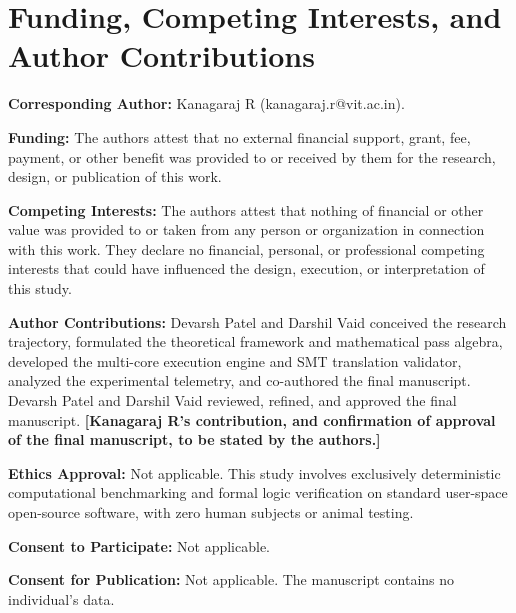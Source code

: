 \section*{Funding, Competing Interests, and Author Contributions}

\textbf{Corresponding Author:} Kanagaraj R (kanagaraj.r@vit.ac.in).

\textbf{Funding:} The authors attest that no external financial support, grant, fee, payment, or other benefit was provided to or received by them for the research, design, or publication of this work.

\textbf{Competing Interests:} The authors attest that nothing of financial or other value was provided to or taken from any person or organization in connection with this work. They declare no financial, personal, or professional competing interests that could have influenced the design, execution, or interpretation of this study.

\textbf{Author Contributions:} Devarsh Patel and Darshil Vaid conceived the research trajectory, formulated the theoretical framework and mathematical pass algebra, developed the multi-core execution engine and SMT translation validator, analyzed the experimental telemetry, and co-authored the final manuscript. Devarsh Patel and Darshil Vaid reviewed, refined, and approved the final manuscript. \textbf{[Kanagaraj R's contribution, and confirmation of approval of the final manuscript, to be stated by the authors.]}

\textbf{Ethics Approval:} Not applicable. This study involves exclusively deterministic computational benchmarking and formal logic verification on standard user-space open-source software, with zero human subjects or animal testing.

\textbf{Consent to Participate:} Not applicable.

\textbf{Consent for Publication:} Not applicable. The manuscript contains no individual's data.
